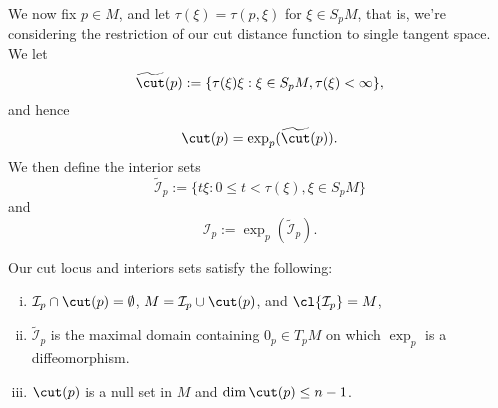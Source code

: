 We now fix $p\in M$, and let $\tau(\xi)=\tau(p,\xi)$ for $\xi\in S_pM$, that is, we're considering the restriction of our cut distance function to single tangent space.  We let
$$\widetilde{\cut}(p):=\{\tau(\xi)\xi:\xi\in S_pM, \tau(\xi)<\infty\},$$
and hence
$$\cut(p)=\exp_p(\widetilde{\cut}(p)).$$
We then define the interior sets
$$\tilde{\mathcal{I}}_p:=\{t\xi:0\leq t<\tau(\xi),\xi\in S_pM\}$$
and
$$\mathcal{I}_p:=\exp_p(\tilde{\mathcal{I}}_p).$$

\begin{lem}
    Our cut locus and interiors sets satisfy the following:
    \begin{enumerate}[i.]
    	\item $\mathcal{I}_p\cap\cut(p)=\emptyset$, $M=\mathcal{I}_p\cup\cut(p)$, and $\cl{\mathcal{I}_p}=M$,
    	\item $\tilde{\mathcal{I}}_p$ is the maximal domain containing $0_p\in T_pM$ on which $\exp_p$ is a diffeomorphism.
    	\item $\cut(p)$ is a null set in $M$ and $\dim{\cut(p)}\leq n-1$.
    \end{enumerate}
\end{lem}

